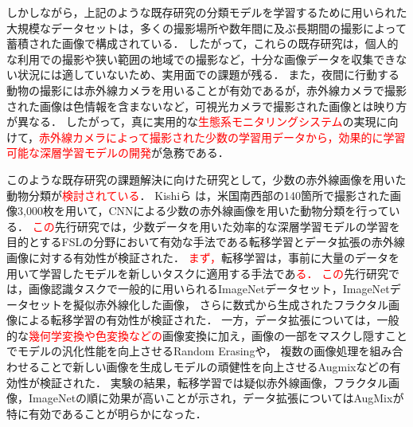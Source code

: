\documentclass[a4paper,11pt,nomag]{jsreport}
\begin{document}
しかしながら，上記のような既存研究の分類モデルを学習するために用いられた大規模なデータセットは，多くの撮影場所や数年間に及ぶ長期間の撮影によって蓄積された画像で構成されている．
したがって，これらの既存研究は，個人的な利用での撮影や狭い範囲の地域での撮影など，十分な画像データを収集できない状況には適していないため、実用面での課題が残る．
また，夜間に行動する動物の撮影には赤外線カメラを用いることが有効であるが，赤外線カメラで撮影された画像は色情報を含まないなど，可視光カメラで撮影された画像とは映り方が異なる．
したがって，真に実用的な\textcolor{red}{生態系モニタリングシステム}の実現に向けて，\textcolor{red}{赤外線カメラによって撮影された少数の学習用データから，効果的に学習可能な深層学習モデルの開発}が急務である．

このような既存研究の課題解決に向けた研究として，少数の赤外線画像を用いた動物分類が\textcolor{red}{検討されている}．
Kishiら \cite{kishimoto2023}は，米国南西部の140箇所で撮影された画像3,000枚を用いて，CNNによる少数の赤外線画像を用いた動物分類を行っている．
\textcolor{red}{この}先行研究では，少数データを用いた効率的な深層学習モデルの学習を目的とするFSLの分野において有効な手法である転移学習とデータ拡張の赤外線画像に対する有効性が検証された．
\textcolor{red}{まず，}転移学習は，事前に大量のデータを用いて学習したモデルを新しいタスクに適用する手法であ\textcolor{red}{る．}
\textcolor{red}{この}先行研究では，画像認識タスクで一般的に用いられるImageNetデータセット，ImageNetデータセットを擬似赤外線化した画像，
さらに数式から生成されたフラクタル画像による転移学習の有効性が検証された．
一方，データ拡張については，一般的な\textcolor{red}{幾何学変換や色変換などの}画像変換に加え，画像の一部をマスクし隠すことでモデルの汎化性能を向上させるRandom Erasingや，
複数の画像処理を組み合わせることで新しい画像を生成しモデルの頑健性を向上させるAugmixなどの有効性が検証された．
実験の結果，転移学習では疑似赤外線画像，フラクタル画像，ImageNetの順に効果が高いことが示され，データ拡張についてはAugMixが特に有効であることが明らかになった．
\end{document}
